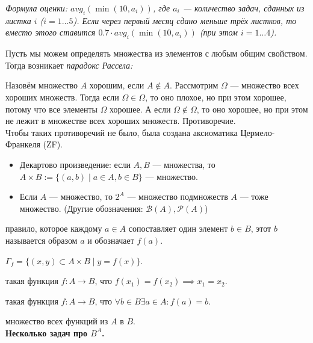 \documentclass[12pt,a4paper]{article}
\begin{document}

\textit{Формула оценки: $avg_i(\min(10,a_i))$, где $a_i$ --- количество задач, сданных из листка $i$ ($i=1\ldots 5$). Если через первый месяц сдано меньше трёх листков, то вместо этого ставится $0.7\cdot avg_i(\min(10,a_i))$ (при этом $i=1\ldots 4$).}\\


Пусть мы можем определять множества из элементов с любым общим свойством. Тогда возникает \textit{парадокс Рассела:}

Назовём множество $A$ хорошим, если $A\notin A$. Рассмотрим $\Omega$ --- множество всех хороших множеств. Тогда если $\Omega\in\Omega$, то оно плохое, но при этом хорошее, потому что все элементы $\Omega$ хорошее. А если $\Omega\notin\Omega$, то оно хорошее, но при этом не лежит в множестве всех хороших множеств. Противоречие.\QEDA\\

Чтобы таких противоречий не было, была создана аксиоматика Цермело-Франкеля (ZF).\\


\begin{itemize}
	\item Декартово произведение: если $A,B$ --- множества, то $A\times B:=\{(a,b)\mid a\in A,b\in B\}$ --- множество.
	\item Если $A$ --- множество, то $2^A$ --- множество подмножеств $A$ --- тоже множество. (Другие обозначения: $\mathcal B(A),\mathcal P(A)$)
\end{itemize}

 правило, которое каждому $a\in A$ сопоставляет один элемент $b\in B$, этот $b$ называется образом $a$ и обозначает $f(a)$.

 $\Gamma_f=\{(x,y)\subset A\times B\mid y=f(x)\}$.

 такая функция $f:A\to B$, что $f(x_1)=f(x_2)\implies x_1=x_2$.

 такая функция $f:A\to B$, что $\forall b\in B\exists a\in A:f(a)=b$.

 множество всех функций из $A$ в $B$.\\

\textbf{Несколько задач про $B^A$.}
\end{document}
